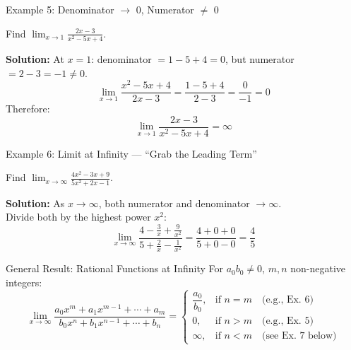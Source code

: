 \documentclass[UTF8,10pt]{beamer}
\begin{document}
\begin{frame}{Example 5: Denominator $\to$ 0, Numerator $\neq$ 0}
\begin{example}
Find $\displaystyle \lim_{x\to 1} \frac{2x-3}{x^2-5x+4}$.
\end{example}
\pause
\textbf{Solution:} At $x=1$: denominator $= 1-5+4 = 0$, but numerator $= 2-3 = -1 \neq 0$.
\[
\lim_{x\to 1} \frac{x^2-5x+4}{2x-3} = \frac{1-5+4}{2-3} = \frac{0}{-1} = 0
\]
\pause
Therefore:
\[
\boxed{\lim_{x\to 1} \frac{2x-3}{x^2-5x+4} = \infty}
\]
\end{frame}

\begin{frame}{Example 6: Limit at Infinity --- ``Grab the Leading Term''}
\begin{example}
Find $\displaystyle \lim_{x\to\infty} \frac{4x^2-3x+9}{5x^2+2x-1}$.
\end{example}
\pause
\textbf{Solution:} As $x \to \infty$, both numerator and denominator $\to \infty$.\\
Divide both by the highest power $x^2$:
\[
\lim_{x\to\infty} \frac{4 - \frac{3}{x} + \frac{9}{x^2}}{5 + \frac{2}{x} - \frac{1}{x^2}}
= \frac{4 + 0 + 0}{5 + 0 - 0} = \boxed{\frac{4}{5}}
\]
\pause
\vspace{0.3em}
\begin{center}
\end{center}
\end{frame}

\begin{frame}{General Result: Rational Functions at Infinity}
For $a_0 b_0 \neq 0$, $m,n$ non-negative integers:
\[
\lim_{x\to\infty} \frac{a_0 x^m + a_1 x^{m-1} + \cdots + a_m}{b_0 x^n + b_1 x^{n-1} + \cdots + b_n}
=
\begin{cases}
\dfrac{a_0}{b_0}, & \text{if } n = m \quad \text{(e.g., Ex.~6)} \\[0.8em]
0, & \text{if } n > m \quad \text{(e.g., Ex.~5)} \\[0.5em]
\infty, & \text{if } n < m \quad \text{(see Ex.~7 below)}
\end{cases}
\]
\end{frame}
\end{document}
